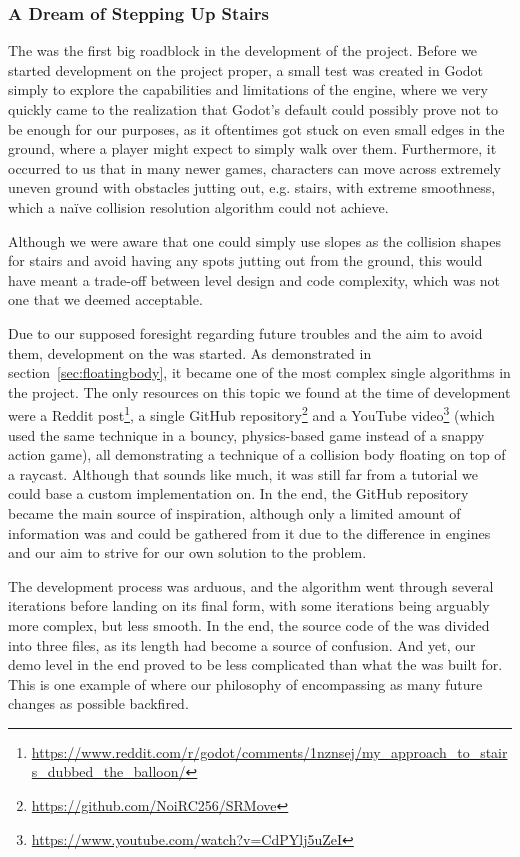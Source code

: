\documentclass[../Main.tex]{subfiles}
\begin{document}
\subsubsection{A Dream of Stepping Up Stairs}\label{sec:a-dream-of-stepping-up}

The  was the first big roadblock in the development of the project. Before we started development on the project proper, a small test was created in Godot simply to explore the capabilities and limitations of the engine, where we very quickly came to the realization that Godot's default  could possibly prove not to be enough for our purposes, as it oftentimes got stuck on even small edges in the ground, where a player might expect to simply walk over them. Furthermore, it occurred to us that in many newer games, characters can move across extremely uneven ground with obstacles jutting out, e.g. stairs, with extreme smoothness, which a naïve collision resolution algorithm could not achieve.

Although we were aware that one could simply use slopes as the collision shapes for stairs and avoid having any spots jutting out from the ground, this would have meant a trade-off between level design and code complexity, which was not one that we deemed acceptable.

Due to our supposed foresight regarding future troubles and the aim to avoid them, development on the  was started. As demonstrated in section~\ref{sec:floatingbody}, it became one of the most complex single algorithms in the project. The only resources on this topic we found at the time of development were a Reddit post\footnote{\url{https://www.reddit.com/r/godot/comments/1nznsej/my_approach_to_stairs_dubbed_the_balloon/}}, a single GitHub repository\footnote{\url{https://github.com/NoiRC256/SRMove}} and a YouTube video\footnote{\url{https://www.youtube.com/watch?v=CdPYlj5uZeI}} (which used the same technique in a bouncy, physics-based game instead of a snappy action game), all demonstrating a technique of a collision body floating on top of a raycast. Although that sounds like much, it was still far from a tutorial we could base a custom implementation on. In the end, the GitHub repository became the main source of inspiration, although only a limited amount of information was and could be gathered from it due to the difference in engines and our aim to strive for our own solution to the problem.

The development process was arduous, and the algorithm went through several iterations before landing on its final form, with some iterations being arguably more complex, but less smooth. In the end, the source code of the  was divided into three files, as its length had become a source of confusion. And yet, our demo level in the end proved to be less complicated than what the  was built for. This is one example of where our philosophy of encompassing as many future changes as possible backfired.
\end{document}
